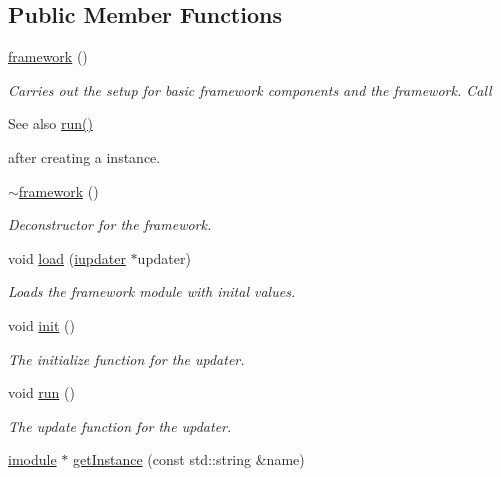 \subsection*{Public Member Functions}
\begin{DoxyCompactItemize}
\item 
\hyperlink{classflounder_1_1framework_ae7f076f63f78093952477e83174120f9}{framework} ()
\begin{DoxyCompactList}\small\item\em Carries out the setup for basic framework components and the framework. Call \begin{DoxySeeAlso}{See also}
\hyperlink{classflounder_1_1framework_aa3a73c8e8f5f0c6ccef3e4de89982434}{run()}


\end{DoxySeeAlso}
after creating a instance. \end{DoxyCompactList}\item 
\hyperlink{classflounder_1_1framework_a4f5440b66d1c2e7e35d9dc7fd733f944}{$\sim$framework} ()
\begin{DoxyCompactList}\small\item\em Deconstructor for the framework. \end{DoxyCompactList}\item 
void \hyperlink{classflounder_1_1framework_a1c6123166e03e5ee0effc375cb7a800c}{load} (\hyperlink{classflounder_1_1iupdater}{iupdater} $\ast$updater)
\begin{DoxyCompactList}\small\item\em Loads the framework module with inital values. \end{DoxyCompactList}\item 
void \hyperlink{classflounder_1_1framework_a88d0efc8e63448e5f342260ffd23054a}{init} ()
\begin{DoxyCompactList}\small\item\em The initialize function for the updater. \end{DoxyCompactList}\item 
void \hyperlink{classflounder_1_1framework_aa3a73c8e8f5f0c6ccef3e4de89982434}{run} ()
\begin{DoxyCompactList}\small\item\em The update function for the updater. \end{DoxyCompactList}\item 
\hyperlink{classflounder_1_1imodule}{imodule} $\ast$ \hyperlink{classflounder_1_1framework_a84a2314d26174ab02b48bcda8fd5b4e4}{get\+Instance} (const std\+::string \&name)

\end{DoxyCompactItemize}
